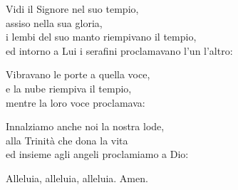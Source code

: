 
\strofa Vidi il Signore nel suo tempio,\\
assiso nella sua gloria,\\
i lembi del suo manto riempivano il tempio,\\
ed intorno a Lui i serafini proclamavano l'un l'altro:

\spazio


\spazio

\strofa Vibravano le porte a quella voce,\\
e la nube riempiva il tempio,\\
mentre la loro voce proclamava:

\spazio


\spazio

\strofa Innalziamo anche noi la nostra lode,\\
alla Trinità che dona la vita\\
ed insieme agli angeli proclamiamo a Dio:

\spazio


\spazio

Alleluia, alleluia, alleluia. Amen.